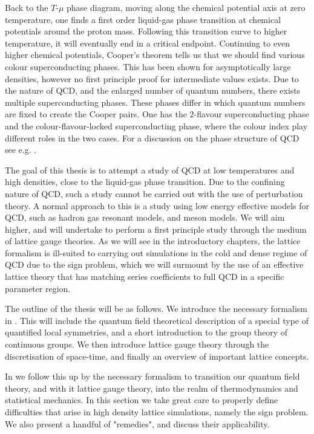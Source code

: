 Back to the $T$-$\mu$ phase diagram, moving along the chemical potential axis at
zero temperature, one finds a first order liquid-gas phase transition at chemical
potentials around the proton mass.  Following this transition curve to higher
temperature, it will eventually end in a critical endpoint. Continuing to even
higher chemical potentials, Cooper's theorem tells us that we should find
various colour superconducting phases. This has been shown for asymptotically
large densities, however no first principle proof for intermediate values
exists. Due to the nature of QCD, and the enlarged number of quantum numbers,
there exists multiple superconducting phases. These phases differ in which
quantum numbers are fixed to create the Cooper pairs. One has the $2$-flavour
superconducting phase and the colour-flavour-locked superconducting phase, where
the colour index play different roles in the two cases. For a discussion on the
phase structure of QCD see e.g.  \citep{Rajagopal:2000wf,Rischke:2003mt}.

The goal of this thesis is to attempt a study of QCD at low temperatures and
high densities, close to the liquid-gas phase transition. Due to the confining
nature of QCD, such a study cannot be carried out with the use of perturbation
theory. A normal approach to this is a study using low energy effective models
for QCD, such as hadron gas resonant models, and meson models. We will aim
higher, and will undertake to perform a first principle study through the medium
of lattice gauge theories. As we will see in the introductory chapters, the
lattice formalism is ill-suited to carrying out simulations in the cold and
dense regime of QCD due to the sign problem, which we will surmount by the use
of an effective lattice theory that has matching series coefficients to full QCD
in a specific parameter region.

The outline of the thesis will be as follows. We introduce the necessary
formalism in . This will include the quantum field theoretical
description of a special type of quantified local symmetries, and a short
introduction to the group theory of continuous groups. We then introduce lattice
gauge theory through the discretisation of space-time, and finally an overview
of important lattice concepts.

In  we follow this up by the necessary formalism to transition
our quantum field theory, and with it lattice gauge theory, into the realm of
thermodynamics and statistical mechanics. In this section we take great care to
properly define difficulties that arise in high density lattice simulations,
namely the sign problem. We also present a handful of "remedies", and discuss
their applicability.

